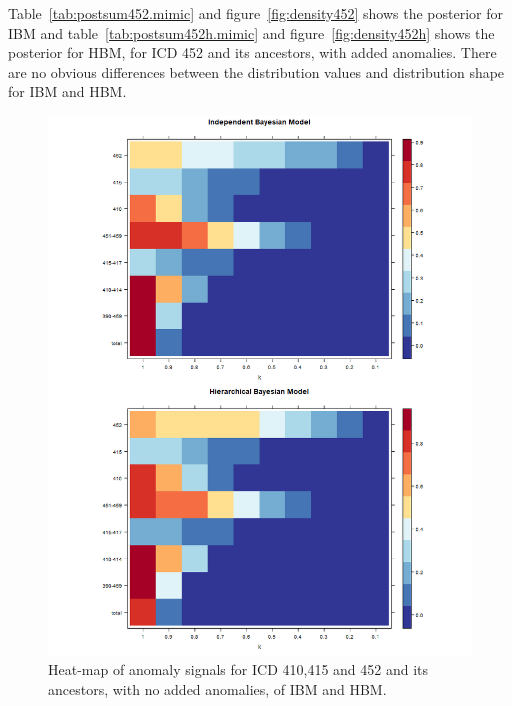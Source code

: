 Table~\ref{tab:postsum452.mimic} and figure~\ref{fig:density452} shows the posterior for IBM and table~\ref{tab:postsum452h.mimic} and figure~\ref{fig:density452h} shows the posterior for HBM, for ICD 452 and its ancestors, with added anomalies. There are no obvious differences between the distribution values and distribution shape for IBM and HBM.

\newpage %

\begin{figure}[!h]
	\centering
	\includegraphics[width=1\linewidth]{../../R-codes/JAGS/plots/mimic/heatnorm}
	\caption{Heat-map of anomaly signals for ICD 410,415 and 452 and its ancestors, with no added anomalies, of IBM and HBM.}
	\label{fig:heatnorm}
\end{figure}

\newpage

